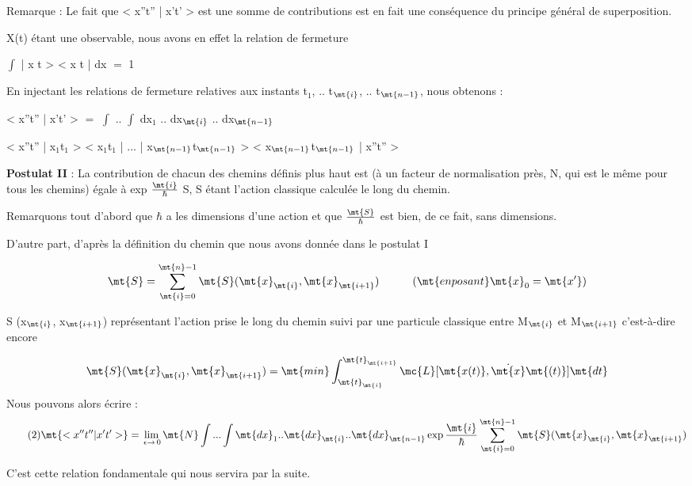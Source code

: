 Remarque : Le fait que < x''t'' | x't' > est une somme de contributions est
en fait une conséquence du principe général de superposition.

X(t) étant une observable, nous avons en effet la relation de
fermeture

\begin{center}
$\int$ | x t > < x t | dx $=$ 1
\end{center}

En injectant les relations de fermeture relatives aux instants
t$_1$, .. t$_\mt{i}$, .. t$_\mt{n-1}$, nous obtenons :

\begin{flushleft}
< x''t'' | x't' > $=$ $\int$ .. $\int$ dx$_1$ .. dx$_\mt{i}$ .. dx$_\mt{n-1}$
\end{flushleft}
\begin{flushright}
< x''t'' | x$_1$t$_1$ > < x$_1$t$_1$ | ... | x$_\mt{n-1}$t$_\mt{n-1}$ > < x$_\mt{n-1}$t$_\mt{n-1}$ | x''t'' >
\end{flushright}


{\bf Postulat II} : La contribution de chacun des chemins définis plus haut est
(à un facteur de normalisation près, N, qui est le même pour tous les
chemins) égale à exp $\frac{\mt{i}}{\hbar}$ S, S étant l'action classique calculée le long
du chemin.

Remarquons tout d'abord que $\hbar$ a les dimensions d'une action
et que $\frac{\mt{S}}{\hbar}$ est bien, de ce fait, sans dimensions.

D'autre part, d'après la définition du chemin que nous avons
donnée dans le postulat I

\[
\mt{S} = \sum_{\mt{i}=0}^{\mt{n}-1} \mt{S} (\mt{x}_\mt{i}, \mt{x}_\mt{i+1})
 \ \ \ \ \ \ \ \ \ (\mt{en posant }\mt{x}_0 = \mt{x'})
\]

S (x$_\mt{i}$, x$_\mt{i+1}$) représentant l'action prise le long du chemin suivi par
une particule classique entre M$_\mt{i}$ et M$_\mt{i+1}$ c'est-à-dire encore

\[
\mt{S} (\mt{x}_\mt{i}, \mt{x}_\mt{i+1}) = \mt{min } \int_{\mt{t}_\mt{i}}^{\mt{t}_\mt{i+1}}
\mc{L} [ \mt{x(t)}, \dot{\mt{x}}\mt{(t)} ] \mt{dt}
\]
Nous pouvons alors écrire :
\[
\tag{2} \mt{< x''t'' | x't' > } = \lim_{\,\epsilon \to \,0} \mt{N} \int...\int
\mt{dx}_1..\mt{dx}_\mt{i}..\mt{dx}_\mt{n-1} \exp\frac{\mt{i}}{\hbar}
\sum_{\mt{i}=0}^{\mt{n}-1} \mt{S} (\mt{x}_\mt{i}, \mt{x}_\mt{i+1})
\]

C'est cette relation fondamentale qui nous servira par la suite.

